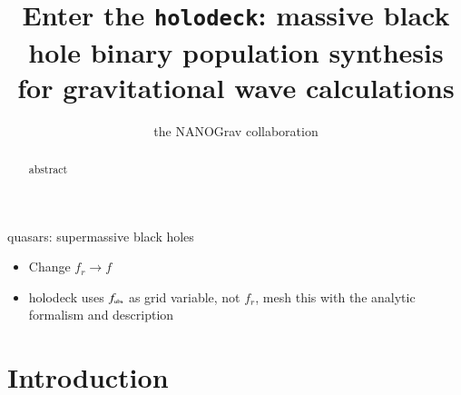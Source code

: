 \documentclass[useAMS, usenatbib]{mnras}
\title[holodeck: MBH binary populations]{Enter the \texttt{holodeck}: massive black hole binary population synthesis for gravitational wave calculations}
\author[NANOGrav]{the NANOGrav collaboration}
\begin{document}
\maketitle

\begin{abstract}
    abstract
\end{abstract}

\begin{keywords}
    quasars: supermassive black holes
\end{keywords}





\begin{itemize}
    \item Change $f_r \rightarrow f$
    \item holodeck uses $f_\trt{obs}$ as grid variable, not $f_r$, mesh this with the analytic formalism and description
\end{itemize}


\section{Introduction}
    \label{sec:intro}
\end{document}
